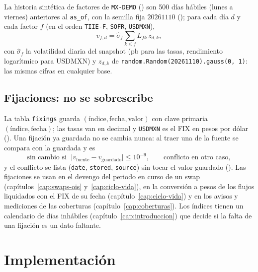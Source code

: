 \begin{sloppypar}
La historia sintética de factores de \texttt{MX-DEMO} ()
son 500 días hábiles (lunes a viernes) anteriores al \texttt{as\_of}, con la semilla fija $20261110$
(); para cada día $d$ y cada factor $f$
(en el orden \texttt{TIIE-F}, \texttt{SOFR}, \texttt{USDMXN}),
\begin{equation}\label{eq:cap13-historia}
  v_{f,d}=\hat\sigma_f\sum_{k\le f}L_{fk}\,z_{d,k},
\end{equation}
con $\hat\sigma_f$ la volatilidad diaria del snapshot (pb para las tasas, rendimiento logarítmico para
USDMXN) y $z_{d,k}$ de \texttt{random.Random(20261110).gauss(0, 1)}: las mismas cifras en cualquier base.

\subsection{Fijaciones: no se sobrescribe}\label{sec:cap13-fijaciones}

La tabla \texttt{fixings} guarda $(\text{índice},\text{fecha},\text{valor})$ con clave primaria
$(\text{índice},\text{fecha})$; las tasas van en decimal y \texttt{USDMXN} es el FIX en pesos por dólar
(). Una fijación ya guardada no se cambia nunca: al traer una de la
fuente se compara con la guardada y es
\begin{equation}\label{eq:cap13-conflicto}
  \text{sin cambio si }\;\bigl|v_{\text{fuente}}-v_{\text{guardado}}\bigr|\le 10^{-9},\qquad
  \text{conflicto en otro caso},
\end{equation}
y el conflicto se lista (\texttt{date}, \texttt{stored}, \texttt{source}) sin tocar el valor guardado
(). Las fijaciones se usan en el devengo del periodo en curso de
un swap (capítulos~\ref{cap:swaps-ois} y~\ref{cap:ciclo-vida}), en la conversión a pesos de los flujos
liquidados con el FIX de su fecha (capítulo~\ref{cap:ciclo-vida}) y en los avisos y mediciones de las coberturas
(capítulo~\ref{cap:coberturas}). Los índices tienen un calendario de días inhábiles
(capítulo~\ref{cap:introduccion}) que decide si la falta de una fijación es un dato faltante.

\section{Implementación}\label{sec:cap13-implementacion}


\end{sloppypar}
